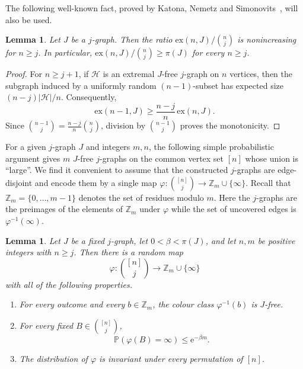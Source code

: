 \documentclass[10pt,a4paper]{article}
\numberwithin{equation}{section}
\newtheorem{lemma}[theorem]{Lemma}
\theoremstyle{definition}
\theoremstyle{remark}
\newcommand{\Z}[1]{\mathbb Z_{#1}}
\newcommand{\me}{\mathrm{e}}
\newcommand{\PP}{m}
\renewcommand{\longrightarrow}{\to}
\begin{document}
The following well-known fact, proved by Katona, Nemetz and Simonovits~\cite{KatonaNemetzSimonovits64}, will also be used.

\begin{lemma}\label{end:lem:finite-density}
Let $J$ be a $j$-graph. Then the ratio ${\mathrm{ex}(n,J)}/{\binom nj}$ is nonincreasing for $n\ge j$. In particular, $\mathrm{ex}(n,J)/\binom{n}{j}\ge \pi(J)$ for every $n\ge j$.
\end{lemma}

\begin{proof}
For $n\ge j+1$, if $\mathcal H$ is an extremal $J$-free $j$-graph on $n$ vertices, then the subgraph induced by a uniformly random $(n-1)$-subset has expected size
\(
 (n-j)|\mathcal H|/n.
\)
Consequently,
\[
 \mathrm{ex}(n-1,J)\ge\frac{n-j}{n}\,\mathrm{ex}(n,J).
\]
Since $\binom{n-1}j=\frac{n-j}{n}\binom nj$, division by $\binom{n-1}j$ proves the monotonicity.  
\end{proof}

For a given $j$-graph $J$ and integers $\PP,n$, 
the following simple probabilistic argument gives $\PP$ $J$-free $j$-graphs  on the common vertex set $[n]$ whose union is ``large''. We find it convenient to assume that the constructed $j$-graphs are edge-disjoint and encode them by a single map $\varphi:\binom{[n]}j\longrightarrow
\Z{\PP}\cup\{\infty\}$. Recall that $\Z{\PP}=\{0,\dots,\PP-1\}$ denotes the set of residues modulo $\PP$. Here the $j$-graphs are the preimages of the elements of $\Z{\PP}$ under $\varphi$ while the set of uncovered edges is $\varphi^{-1}(\infty)$.

\begin{lemma}\label{lem:app-global-colouring}
Let $J$ be a fixed $j$-graph, let $0<\beta<\pi(J)$, and let $n,\PP$ be positive integers with $n\ge j$.  Then there is a random map
\[
 \varphi:\binom{[n]}j\longrightarrow
 \Z{\PP}\cup\{\infty\}
\]
with all of the following properties.
\begin{enumerate}[label=\textup{(\roman*)}]
\item\label{it:JFree} For every outcome and every $b\in\Z{\PP}$, the colour class $\varphi^{-1}(b)$ is $J$-free.
\item\label{it:Uncovered} For every fixed $B\in\binom{[n]}j$,
\begin{equation*}
 \mathbb P(\varphi(B)=\infty)\le \me^{-\beta \PP}.
\end{equation*}
\item\label{it:Invariance} The distribution of $\varphi$ is invariant under every permutation of $[n]$.
\end{enumerate}
\end{lemma}
\end{document}
